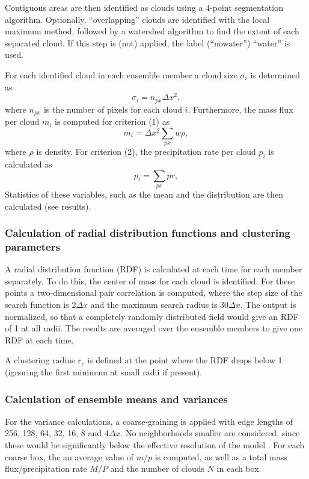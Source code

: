 \documentclass[a4paper, 12pt, draft]{article}
\begin{document}
Contiguous areas are then identified as clouds using a 4-point segmentation algorithm. Optionally, ``overlapping'' clouds are identified with the local maximum method, followed by a watershed algorithm to find the extent of each separated cloud. If this step is (not) applied, the label (``nowater'') ``water'' is used. 

For each identified cloud in each ensemble member a cloud size $\sigma_i$ is determined as
\begin{equation} \label{eq:cld_size}
 \sigma_i = n_{px} \Delta x^2,
\end{equation}
where $n_{px}$ is the number of pixels for each cloud $i$. Furthermore, the mass flux per cloud $m_i$ is computed for criterion (1) as
\begin{equation} \label{eq:mass_flux_per_cloud}
 m_i = \Delta x^2 \sum_{px} w \rho,
\end{equation}
where $\rho$ is density. For criterion (2), the precipitation rate per cloud $p_i$ is calculated as
\begin{equation} \label{eq:pr_per_cloud}
 p_i = \sum_{px} pr,
\end{equation}
Statistics of these variables, such as the mean and the distribution are then calculated (see results).

\subsubsection{Calculation of radial distribution functions and clustering parameters}
A radial distribution function (RDF) is calculated at each time for each member separately. To do this, the center of mass for each cloud is identified. For these points a two-dimensional pair correlation is computed, where the step size of the search function is 2$\Delta x$ and the maximum search radius is 30$\Delta x$. The output is normalized, so that a completely randomly distributed field would give an RDF of 1 at all radii. The results are averaged over the ensemble members to give one RDF at each time. 

A clustering radius $r_c$ is defined at the point where the RDF drops below 1 (ignoring the first minimum at small radii if present). 

\subsubsection{Calculation of ensemble means and variances}
For the variance calculations, a coarse-graining is applied with edge lengths of 256, 128, 64, 32, 16, 8 and 4$\Delta x$. No neighborhoods smaller are considered, since these would be significantly below the effective resolution of the model \citep{Bierdel2012}. For each coarse box, the an average value of $m$/$p$ is computed, as well as a total mass flux/precipitation rate $M$/$P$ and the number of clouds $N$ in each box.
\end{document}
